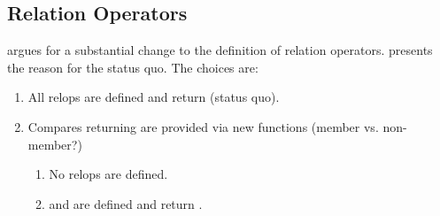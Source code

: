 \subsection{Relation Operators}
\textcite{P0820R1} argues for a substantial change to the definition of relation operators.
\textcite{P0851R0} presents the reason for the status quo.
The choices are:
\begin{enumerate}
  \item All relops are defined and return \mask (status quo).
  \item Compares returning \mask are provided via new functions (member vs. non-member?)
    \begin{enumerate}
      \item No relops are defined.
      \item {} and  are defined and return \bool.
    \end{enumerate}
\end{enumerate}


